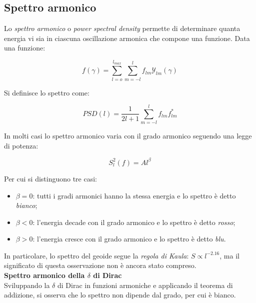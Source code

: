 \documentclass[a4paper,12pt]{book}
\begin{document}
\subsection{\textcolor{colore7}{Spettro armonico}}

Lo \textit{spettro armonico} o \textit{power spectral density} permette di determinare quanta energia vi sia in ciascuna oscillazione armonica che compone una funzione.
Data una funzione:

\begin{equation}
    f(\gamma) = \sum _{l=o}^{l_{max}} \sum_{m=-l}^l f_{lm} \mathcal{Y}_{lm}(\gamma)
\end{equation}

\noindent Si definisce lo spettro come:

\begin{equation}
    PSD(l) = \frac{1}{2l+1} \sum_{m=-l}^l f_{lm} f^*_{lm}
\end{equation}

\noindent In molti casi lo spettro armonico varia con il grado armonico seguendo una legge di potenza:

\begin{equation}
    S^2_l(f) = Al^\beta
\end{equation}

\noindent
Per cui si distinguono tre casi:

\begin{itemize}
    \item $\beta = 0$: tutti i gradi armonici hanno la stessa energia e lo spettro è detto \textit{bianco};
    \item $\beta < 0$: l'energia decade con il grado armonico e lo spettro è detto \textit{rosso};
    \item $\beta > 0$: l'energia cresce con il grado armonico e lo spettro è detto \textit{blu}.
\end{itemize}

\noindent
In particolare, lo spettro del geoide segue la \textit{regola di Kaula}: $S \propto l^{-2.16}$, ma il significato di questa osservazione non è ancora stato compreso.\\

\noindent \textbf{\textcolor{colore4}{Spettro armonico della $\delta$ di Dirac}}\\

\noindent
Sviluppando la $\delta$ di Dirac in funzioni armoniche e applicando il teorema di addizione, si osserva che lo spettro non dipende dal grado, per cui è bianco. 
\end{document}
